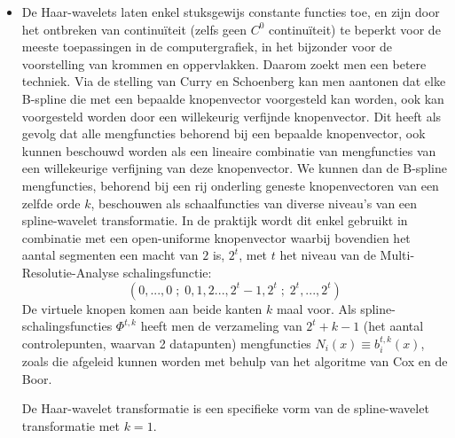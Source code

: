 \begin{enumerate}
			
	{
		\begin{itemize} 
			\item De Haar-wavelets laten enkel stuksgewijs constante functies toe, en zijn door het ontbreken van continuïteit (zelfs geen $C^0$ continuïteit) te beperkt voor de meeste toepassingen in de computergrafiek, in het bijzonder voor de voorstelling van krommen en oppervlakken. Daarom zoekt men een betere techniek. Via de stelling van Curry en Schoenberg kan men aantonen dat elke B-spline die met een bepaalde knopenvector voorgesteld kan worden, ook kan voorgesteld worden door een willekeurig verfijnde knopenvector. Dit heeft als gevolg dat alle mengfuncties behorend bij een bepaalde knopenvector, ook kunnen beschouwd worden als een lineaire combinatie van mengfuncties van een willekeurige verfijning van deze knopenvector. We kunnen dan de B-spline mengfuncties, behorend bij een rij onderling geneste knopenvectoren van een zelfde orde $k$, beschouwen als schaalfuncties van diverse niveau's van een spline-wavelet transformatie. In de praktijk wordt dit enkel gebruikt in combinatie met een open-uniforme knopenvector waarbij bovendien het aantal segmenten een macht van $2$ is, $2^t$, met $t$ het niveau van de Multi-Resolutie-Analyse schalingsfunctie:
			$$(0, ...,0\;;\;0,1,2...,2^t-1,2^t\;;\;2^t,...,2^t)$$
			De virtuele knopen komen aan beide kanten $k$ maal voor. Als spline-schalingsfuncties $\Phi^{t, k}$ heeft men de verzameling van $2^t + k - 1$ (het aantal controlepunten, waarvan 2 datapunten) mengfuncties $N_i(x) \equiv b_i^{t, k}(x)$, zoals die afgeleid kunnen worden met behulp van het algoritme van Cox en de Boor.
			
			De Haar-wavelet transformatie is een specifieke vorm van de spline-wavelet transformatie met $k = 1$. 


\end{itemize}}
\end{enumerate}
